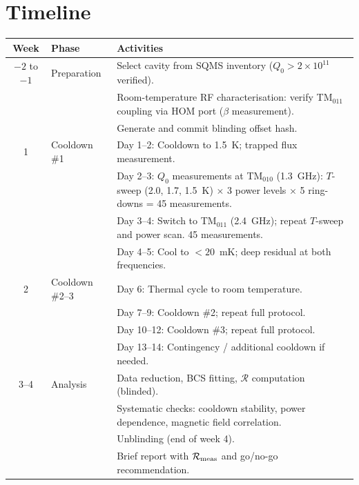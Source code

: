 \documentclass[11pt]{article}
\newcommand{\ee}[1]{\times 10^{#1}}
\newcommand{\Rq}{\mathcal{R}}
\begin{document}
\section{Timeline}
\label{sec:timeline}

\begin{center}
\renewcommand{\arraystretch}{1.3}
\begin{tabular}{@{}clp{8cm}@{}}
\toprule
\textbf{Week} & \textbf{Phase} & \textbf{Activities} \\
\midrule
$-2$ to $-1$ & Preparation &
  Select cavity from SQMS inventory ($Q_0 > 2\ee{11}$ verified). \\
  & & Room-temperature RF characterisation: verify TM$_{011}$ coupling
  via HOM port ($\beta$ measurement). \\
  & & Generate and commit blinding offset hash. \\
\midrule
1 & Cooldown \#1 &
  Day 1--2: Cooldown to 1.5~K; trapped flux measurement. \\
  & & Day 2--3: $Q_0$ measurements at TM$_{010}$ (1.3~GHz):
  $T$-sweep (2.0, 1.7, 1.5~K) $\times$ 3 power levels
  $\times$ 5 ring-downs = 45 measurements. \\
  & & Day 3--4: Switch to TM$_{011}$ (2.4~GHz); repeat $T$-sweep
  and power scan. 45 measurements. \\
  & & Day 4--5: Cool to $< 20$~mK; deep residual at both frequencies. \\
\midrule
2 & Cooldown \#2--3 &
  Day 6: Thermal cycle to room temperature. \\
  & & Day 7--9: Cooldown \#2; repeat full protocol. \\
  & & Day 10--12: Cooldown \#3; repeat full protocol. \\
  & & Day 13--14: Contingency / additional cooldown if needed. \\
\midrule
3--4 & Analysis &
  Data reduction, BCS fitting, $\Rq$ computation (blinded). \\
  & & Systematic checks: cooldown stability, power dependence,
  magnetic field correlation. \\
  & & Unblinding (end of week 4). \\
  & & Brief report with $\Rq_{\rm meas}$ and go/no-go recommendation. \\
\bottomrule
\end{tabular}
\end{center}
\end{document}
